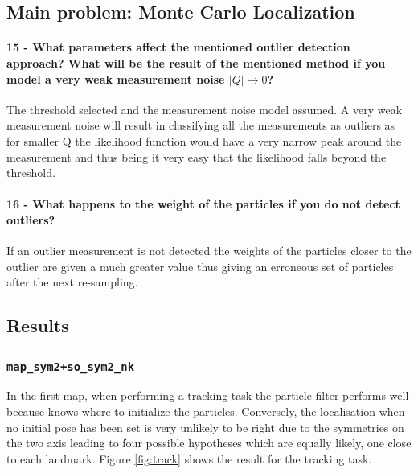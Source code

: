 \documentclass[12pt]{article}
\begin{document}
\subsection{Main problem: Monte Carlo Localization}

\paragraph{15 - What parameters affect the mentioned outlier detection approach? What will be the result of the mentioned method if you model a very weak measurement noise \(|Q| \to 0\)?}
The threshold selected and the measurement noise model assumed. A very weak measurement noise will result in classifying all the measurements as outliers as for smaller Q the likelihood function would have a very narrow peak around the measurement and thus being it very easy that the likelihood falls beyond the threshold.

\paragraph{16 - What happens to the weight of the particles if you do not detect outliers?}
If an outlier measurement is not detected the weights of the particles closer to the outlier are given a much greater value thus giving an erroneous set of particles after the next re-sampling.

\subsection{Results}

\subsubsection{\texttt{map\_sym2+so\_sym2\_nk}}

In the first map, when performing a tracking task the particle filter performs well because knows where to initialize the particles. Conversely, the localisation when no initial pose has been set is very unlikely to be right due to the symmetries on the two axis leading to four possible hypotheses which are equally likely, one close to each landmark. Figure \ref{fig:track} shows the result for the tracking task.\\
\end{document}
